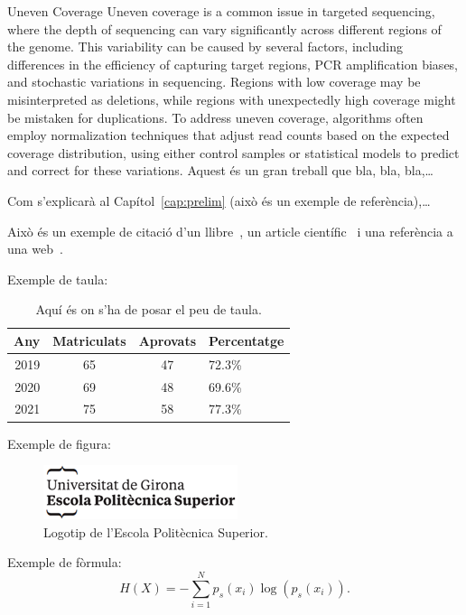 \documentclass[a4paper,12pt,twoside]{ThesisStyle}
\begin{document}
Uneven Coverage
Uneven coverage is a common issue in targeted sequencing, where the depth of sequencing can vary significantly across different regions of the genome. This variability can be caused by several factors, including differences in the efficiency of capturing target regions, PCR amplification biases, and stochastic variations in sequencing. Regions with low coverage may be misinterpreted as deletions, while regions with unexpectedly high coverage might be mistaken for duplications. To address uneven coverage, algorithms often employ normalization techniques that adjust read counts based on the expected coverage distribution, using either control samples or statistical models to predict and correct for these variations.
Aquest és un gran treball que bla, bla, bla,\ldots

Com s'explicarà al Capítol~\ref{cap:prelim} (això és un exemple de referència),\ldots

Això és un exemple de citació d'un llibre~\cite{Coleman1974}, un article científic~\cite{Ruiz2008} i una referència a una web~\cite{Halcon}.

Exemple de taula:
\begin{table}[htb]
\centering
\begin{tabular}{ | r | c | c | l | }
 \hline
  Any & Matriculats & Aprovats & Percentatge\\
\hline
 2019  & 65 & 47 & 72.3\%\\
 2020  & 69 & 48 & 69.6\%\\
 2021  & 75 & 58 & 77.3\%\\
  \hline
  \end{tabular}
\caption{Aquí és on s'ha de posar el peu de taula.}
\label{taula:taulaexemple} 
\end{table}

Exemple de figura:
\begin{figure}[htb]
\centering
\includegraphics[width=8 cm]{imatges/logo_eps.png}
\caption{\label{fig:logo} Logotip de l'Escola Politècnica Superior.}
\end{figure}

Exemple de fòrmula:
\begin{equation}
H(X) = -\sum_{i=1}^{N}p_s(x_i) \log \left( p_s(x_i) \right).
\label{equ:entropia}
\end{equation}
\end{document}
